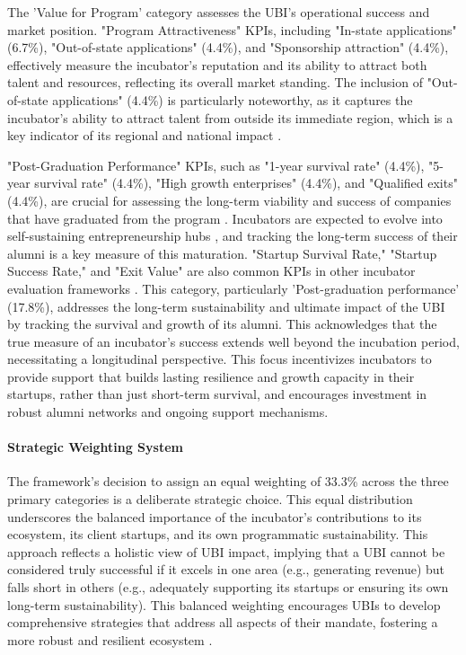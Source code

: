\documentclass[../Main.tex]{subfiles}
\begin{document}
The 'Value for Program' category assesses the UBI's operational success and market position. "Program Attractiveness" KPIs, including "In-state applications" (6.7\%), "Out-of-state applications" (4.4\%), and "Sponsorship attraction" (4.4\%), effectively measure the incubator's reputation and its ability to attract both talent and resources, reflecting its overall market standing. The inclusion of "Out-of-state applications" (4.4\%) is particularly noteworthy, as it captures the incubator's ability to attract talent from outside its immediate region, which is a key indicator of its regional and national impact \cite{ubi2019world,ubi2021world}.

"Post-Graduation Performance" KPIs, such as "1-year survival rate" (4.4\%), "5-year survival rate" (4.4\%), "High growth enterprises" (4.4\%), and "Qualified exits" (4.4\%), are crucial for assessing the long-term viability and success of companies that have graduated from the program \cite{UBI_KeyFactors}. Incubators are expected to evolve into self-sustaining entrepreneurship hubs \cite{ubi2019world,ubi2021world}, and tracking the long-term success of their alumni is a key measure of this maturation. "Startup Survival Rate," "Startup Success Rate," and "Exit Value" are also common KPIs in other incubator evaluation frameworks   \cite{QuickersVenture_IncubatorKPI}. This category, particularly 'Post-graduation performance' (17.8\%), addresses the long-term sustainability and ultimate impact of the UBI by tracking the survival and growth of its alumni. This acknowledges that the true measure of an incubator's success extends well beyond the incubation period, necessitating a longitudinal perspective. This focus incentivizes incubators to provide support that builds lasting resilience and growth capacity in their startups, rather than just short-term survival, and encourages investment in robust alumni networks and ongoing support mechanisms.

\paragraph{Strategic Weighting System}
The framework's decision to assign an equal weighting of 33.3\% across the three primary categories is a deliberate strategic choice. This equal distribution underscores the balanced importance of the incubator's contributions to its ecosystem, its client startups, and its own programmatic sustainability. This approach reflects a holistic view of UBI impact, implying that a UBI cannot be considered truly successful if it excels in one area (e.g., generating revenue) but falls short in others (e.g., adequately supporting its startups or ensuring its own long-term sustainability). This balanced weighting encourages UBIs to develop comprehensive strategies that address all aspects of their mandate, fostering a more robust and resilient ecosystem \cite{InsideHigherEd_2023_BestPractices}.
\end{document}
